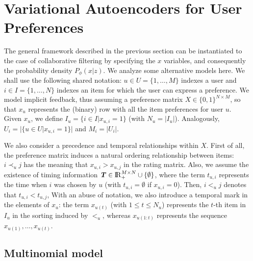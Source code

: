 \documentclass[sigconf]{acmart}
\newcommand{\bs}[1]{\ensuremath{\bm{\mathit{#1}}}}
\numberwithin{equation}{section}
\begin{document}
\section{Variational Autoencoders for User Preferences}\label{sec:vae}

The general framework described in the previous section can be
instantiated to the case of collaborative filtering by specifying the
\bs{x} variables, and consequently the probability density
$P_\phi(\bs{x} | \bs{z})$. We analyze some alternative models here. We
shall use the following shared notation: $u \in U =\{1,
  \ldots, M\}$ indexes a user and $i \in I = \{1, \ldots, N\}$ indexes an
item for which the user can express a preference. We model implicit
feedback, thus assuming a preference matrix $\bs{X} \in
\{0,1\}^{N\times M}$, so that $\bs{x}_u$ represents the (binary) row
with all the item preferences for user $u$. Given $\bs{x}_u$, we define
$I_u= \{i\in I | x_{u,i} = 1 \}$ (with $N_u = |I_u|$). Analogously, $U_i= |\{u\in U |
x_{u,i} = 1 \}|$ and $M_i = |U_i|$. 

We also consider a precedence and temporal relationships
within \bs{X}. First of all, the preference matrix induces a natural ordering
relationship between items: $i \prec_u j$ has the meaning that
$x_{u,i} > x_{u,j}$ in the rating matrix.  Also, we assume the
existence of timing information $\bs{T}\in
{\rm I\!R}_{+}^{M\times N}\cup \{\emptyset\}$, where the term $t_{u,i}$
represents the time when $i$ was chosen by $u$ (with $t_{u,i} =
\emptyset$ if $x_{u,i} = 0$). Then, $i <_u j$ denotes that $t_{u,i} <
t_{u,j}$, With an abuse of notation, we also introduce a temporal mark
in the elements of $\bs{x}_u$: the term $\bs{x}_{u(t)}$ (with $1 \leq t
\leq N_u$) represents the $t$-th item in $I_u$ in the sorting induced
by $<_u$, whereas $\bs{x}_{u(1:t)}$ represents the sequence
$\bs{x}_{u(1)}, \ldots, \bs{x}_{u(t)}$. 

\subsection{Multinomial model}
\label{sec:mvae}
\end{document}
